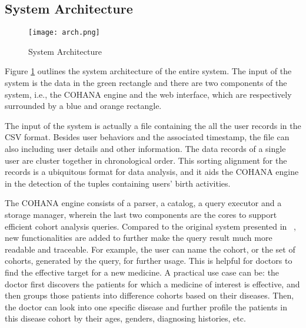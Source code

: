 
\subsection{System Architecture}

\begin{figure}
    \centering
    \texttt{[image: arch.png]}
    \vspace{-1em}
    \caption{System Architecture}
    \label{fig:sys_arch}
    \vspace{-2em}
\end{figure}

Figure \ref{fig:sys_arch} outlines the system architecture of the entire system. The input of the system is the data in the green rectangle and there are two components of the system, i.e., the COHANA engine and the web interface, which are respectively surrounded by a blue and orange rectangle. 

The input of the system is actually a file containing the all the user records in the CSV format. 
Besides user behaviors and the associated timestamp, the file can also 
including user details and other information.
The data records of a single user are cluster together in chronological order. 
This sorting alignment for the records is a ubiquitous format for data analysis, and it aids the COHANA engine in the detection of the tuples containing users' birth activities.

The COHANA engine consists of a parser, a catalog, a query executor and a storage manager, wherein the last two components are the cores to support efficient cohort analysis queries. 
Compared to the original system presented in ~\cite{jiang2016cohort}, new functionalities are added to further make the query result much more readable and traceable.
For example, the user can name the cohort, or the set of cohorts, generated by the query, for further usage.
This is helpful for doctors to find the effective target for a new medicine. 
A practical use case can be: the doctor first discovers the patients for which a medicine of interest is effective,
and then groups those patients into difference cohorts based on their diseases. Then, the doctor can look into one specific disease and further profile the patients in this disease cohort by their ages, genders, diagnosing histories, etc.

